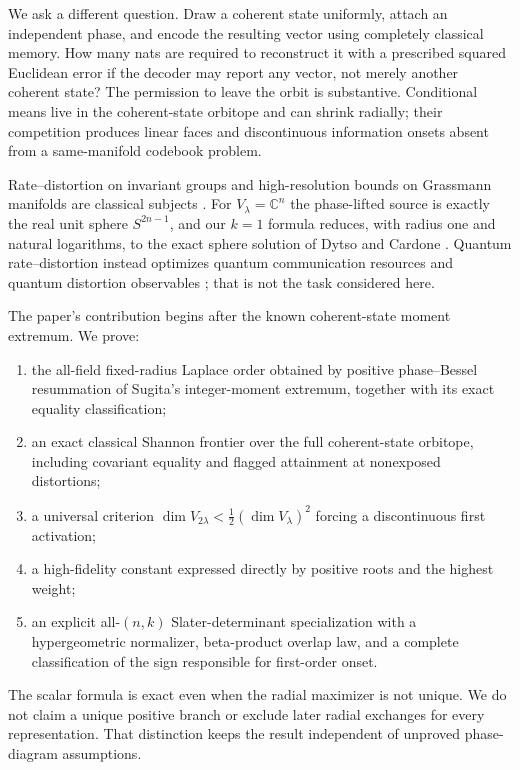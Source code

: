 \documentclass[11pt,a4paper]{article}
\newcommand{\C}{\mathbb C}
\begin{document}
We ask a different question.  Draw a coherent state uniformly, attach an
independent phase, and encode the resulting vector using completely
classical memory.  How many nats are required to reconstruct it with a
prescribed squared Euclidean error if the decoder may report any vector,
not merely another coherent state?  The permission to leave the orbit is
substantive.  Conditional means live in the coherent-state orbitope and can
shrink radially; their competition produces linear faces and discontinuous
information onsets absent from a same-manifold codebook problem.

Rate--distortion on invariant groups and high-resolution bounds on
Grassmann manifolds are classical subjects
\cite{Harremoes2009,DaiLiuRider2008,RieglerKolianderBolcskei2023}.
For $V_\lambda=\C^n$ the phase-lifted source is exactly the real unit sphere
$S^{2n-1}$, and our $k=1$ formula reduces, with radius one and natural
logarithms, to the exact sphere solution of Dytso and Cardone
\cite{DytsoCardone2024}.  Quantum rate--distortion instead optimizes quantum
communication resources and quantum distortion observables
\cite{Barnum2000,KhanianWinter2022}; that is not the task considered here.

The paper's contribution begins after the known coherent-state moment
extremum.  We prove:
\begin{enumerate}
\item the all-field fixed-radius Laplace order obtained by positive
phase--Bessel resummation of Sugita's integer-moment extremum, together with
its exact equality classification;
\item an exact classical Shannon frontier over the full coherent-state
orbitope, including covariant equality and flagged attainment at
nonexposed distortions;
\item a universal criterion
$\dim V_{2\lambda}<\tfrac12(\dim V_\lambda)^2$ forcing a discontinuous first
activation;
\item a high-fidelity constant expressed directly by positive roots and the
highest weight;
\item an explicit all-$(n,k)$ Slater-determinant specialization with a
hypergeometric normalizer, beta-product overlap law, and a complete
classification of the sign responsible for first-order onset.
\end{enumerate}

The scalar formula is exact even when the radial maximizer is not unique.
We do not claim a unique positive branch or exclude later radial exchanges
for every representation.  That distinction keeps the result independent
of unproved phase-diagram assumptions.
\end{document}
